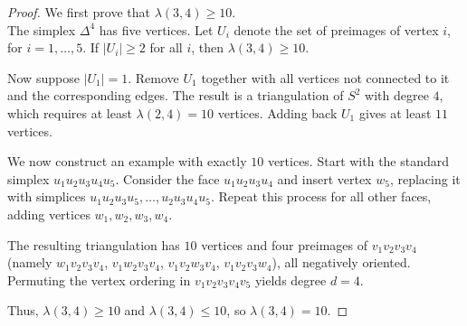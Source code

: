 \documentclass[10pt,a4paper]{amsart}
\begin{document}
\begin{proof}
We first prove that $\lambda(3,4) \geq 10$.\\
The simplex $\Delta^4$ has five vertices. Let $U_i$ denote the set of preimages of vertex $i$, for $i=1,\dots,5$. If $|U_i| \geq 2$ for all $i$, then $\lambda(3,4) \geq 10$.

Now suppose $|U_1| = 1$. Remove $U_1$ together with all vertices not connected to it and the corresponding edges. The result is a triangulation of $S^2$ with degree $4$, which requires at least $\lambda(2,4) = 10$ vertices. Adding back $U_1$ gives at least $11$ vertices.

We now construct an example with exactly $10$ vertices. Start with the standard simplex $u_1 u_2 u_3 u_4 u_5$. Consider the face $u_1 u_2 u_3 u_4$ and insert vertex $w_5$, replacing it with simplices $u_1 u_2 u_3 u_5, \dots, u_2 u_3 u_4 u_5$. Repeat this process for all other faces, adding vertices $w_1, w_2, w_3, w_4$.

The resulting triangulation has $10$ vertices and four preimages of $v_1 v_2 v_3 v_4$ (namely $w_1 v_2 v_3 v_4$, $v_1 w_2 v_3 v_4$, $v_1 v_2 w_3 v_4$, $v_1 v_2 v_3 w_4$), all negatively oriented. Permuting the vertex ordering in $v_1 v_2 v_3 v_4 v_5$ yields degree $d=4$.

Thus, $\lambda(3,4) \geq 10$ and $\lambda(3,4) \leq 10$, so $\lambda(3,4) = 10$.
\end{proof}
\end{document}
